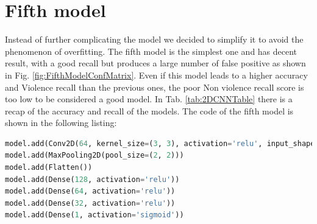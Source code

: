 \section{Fifth model}
Instead of further complicating the model we decided to simplify it to avoid the phenomenon of overfitting. The fifth model is the simplest one and has decent result, with a good recall but produces a large number of false positive as shown in  Fig. \ref{fig:FifthModelConfMatrix}. Even if this model leads to a higher accuracy and Violence recall than the previous ones, the poor Non violence recall score is too low to be considered a good model. In Tab. \ref{tab:2DCNNTable} there is a recap of the accuracy and recall of the models. The code of the fifth model is shown in the following listing: 

\begin{lstlisting}[language=python, caption={Fifth model}, label={lst:Fifth model}]
model.add(Conv2D(64, kernel_size=(3, 3), activation='relu', input_shape=input_shape))
model.add(MaxPooling2D(pool_size=(2, 2)))
model.add(Flatten())
model.add(Dense(128, activation='relu'))
model.add(Dense(64, activation='relu'))
model.add(Dense(32, activation='relu'))
model.add(Dense(1, activation='sigmoid'))
\end{lstlisting}
\begin{table}[]
    \centering
    \caption{2D model accuracy and recall}
    \label{tab:2DCNNTable}
\end{table}

